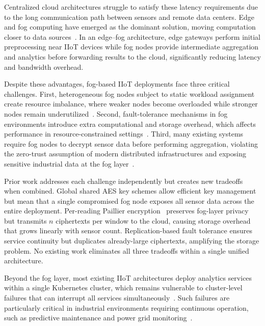 \documentclass[conference]{IEEEtran}
\begin{document}
    Centralized cloud architectures struggle to satisfy these latency 
    requirements due to the long communication path between sensors and 
    remote data centers. Edge and fog computing have emerged as the 
    dominant solution, moving computation closer to data 
    sources~\cite{jin2024}. In an edge--fog architecture, edge gateways 
    perform initial preprocessing near IIoT devices while fog nodes 
    provide intermediate aggregation and analytics before forwarding 
    results to the cloud, significantly reducing latency and bandwidth 
    overhead.

    Despite these advantages, fog-based IIoT deployments face three 
    critical challenges. First, heterogeneous fog nodes subject to static 
    workload assignment create resource imbalance, where weaker nodes 
    become overloaded while stronger nodes remain 
    underutilized~\cite{kashani2023}. Second, fault-tolerance mechanisms in fog environments introduce extra computational and storage overhead, which affects performance in resource-constrained settings~\cite{chen2024lb}. Third, many 
    existing systems require fog nodes to decrypt sensor data before 
    performing aggregation, violating the zero-trust assumption of modern 
    distributed infrastructures and exposing sensitive industrial data at 
    the fog layer~\cite{mirani2022}.



    Prior work addresses each challenge independently but creates new 
    tradeoffs when combined. Global shared AES key schemes allow 
    efficient key management but mean that a single compromised fog node 
    exposes all sensor data across the entire deployment. Per-reading 
    Paillier encryption~\cite{peng2022} preserves fog-layer privacy but 
    transmits $n$ ciphertexts per window to the cloud, causing storage 
    overhead that grows linearly with sensor count. Replication-based 
    fault tolerance ensures service continuity but duplicates 
    already-large ciphertexts, amplifying the storage problem. No 
    existing work eliminates all three tradeoffs within a single unified 
    architecture.

    Beyond the fog layer, most existing IIoT architectures deploy 
    analytics services within a single Kubernetes cluster, which 
    remains vulnerable to cluster-level failures that can interrupt 
    all services simultaneously~\cite{burns2016}. Such failures are 
    particularly critical in industrial environments requiring 
    continuous operation, such as predictive maintenance and power 
    grid monitoring~\cite{burhan2023}.
\end{document}
